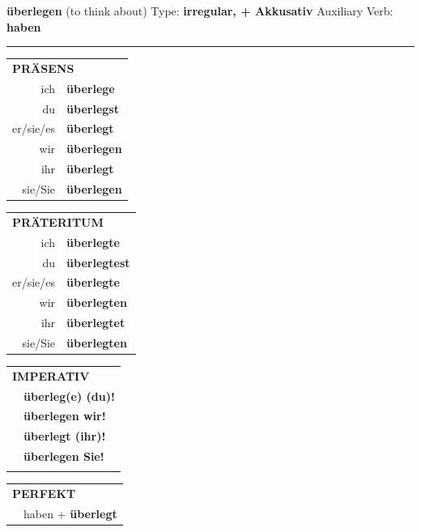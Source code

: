 \documentclass[10pt,a4paper]{revtex4-2}
\begin{document}
\begin{verbbox-acc}
    {\Large \bf überlegen} (to think about) \hfill Type: \textbf{irregular, + Akkusativ} \hfill Auxiliary Verb: \textbf{haben} 
    
     \vspace{5pt}

    \hrule
    
    \vspace{5pt}

  \begin{tabular}{rl}
     \multicolumn{2}{l}{\textbf{PRÄSENS} }\\
    ich & \textbf{überlege}\\
    du & \textbf{überlegst}\\
    er/sie/es & \textbf{überlegt}\\
    wir & \textbf{überlegen}\\
    ihr & \textbf{überlegt}\\
    sie/Sie & \textbf{überlegen}\\
  \end{tabular}
  \hfill
     \begin{tabular}{rl}
    \multicolumn{2}{l}{\textbf{PRÄTERITUM} }\\
    ich & \textbf{überlegte}\\
    du & \textbf{überlegtest}\\
    er/sie/es & \textbf{überlegte}\\
    wir & \textbf{überlegten}\\
    ihr & \textbf{überlegtet}\\
    sie/Sie & \textbf{überlegten}\\
  \end{tabular}
  \hfill
  \begin{tabular}{rl}
     \multicolumn{2}{l}{\textbf{IMPERATIV} }\\
   & \textbf{überleg(e) (du)!}\\
   & \textbf{überlegen wir!}\\
   & \textbf{überlegt (ihr)!}\\
   & \textbf{überlegen Sie!}\\
   & \vspace{10pt}
  \end{tabular}

    \vspace{10pt}

 \begin{tabular}{rl}
     \multicolumn{2}{l}{\textbf{PERFEKT}}\\
   & haben + \textbf{überlegt}\\
  \end{tabular}
\hfill
   \begin{tabular}{rl}
   

\end{tabular}
\end{verbbox-acc}
\end{document}
